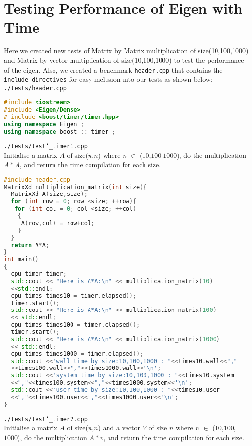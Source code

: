 \documentclass[11pt]{article}
\begin{document}
\section{Testing Performance of Eigen with Time}
Here we created new tests of Matrix by Matrix multiplication of size(10,100,1000) and Matrix by vector multiplication of size(10,100,1000) to test the performance of the eigen. Also, we created a benchmark \texttt{header.cpp} that contains the \texttt{include directives} for easy inclusion into our tests as shown below;\\
\vspace{5mm}
\texttt{./tests/header.cpp} 
\begin{lstlisting}[language=c++]
#include <iostream>
#include <Eigen/Dense>
# include <boost/timer/timer.hpp>
using namespace Eigen ;
using namespace boost :: timer ;
\end{lstlisting}
\vspace{5mm}
\texttt{./tests/test\char`_timer1.cpp}\\
Initialise a matrix $A$ of size($n$,$n$) where $n$ $\in$ ($10$,$100$,$1000$), do the multiplication $A*A$, and return the time compilation for each size.
\begin{lstlisting}[language=c++]
#include header.cpp
MatrixXd multiplication_matrix(int size){
  MatrixXd A(size,size);
  for (int row = 0; row <size; ++row){
   for (int col = 0; col <size; ++col)
    {
     A(row,col) = row+col;
    }
  }
  return A*A;
}
int main()
{
  cpu_timer timer;
  std::cout << "Here is A*A:\n" << multiplication_matrix(10)
  <<std::endl;
  cpu_times times10 = timer.elapsed();
  timer.start();
  std::cout << "Here is A*A:\n" << multiplication_matrix(100)
  << std::endl;
  cpu_times times100 = timer.elapsed();
  timer.start();  
  std::cout << "Here is A*A:\n" << multiplication_matrix(1000) 
  << std::endl;
  cpu_times times1000 = timer.elapsed();
  std::cout <<"wall time by size:10,100,1000 : "<<times10.wall<<","
  <<times100.wall<<","<<times1000.wall<<'\n';
  std::cout <<"system time by size:10,100,1000 : "<<times10.system
  <<","<<times100.system<<","<<times1000.system<<'\n';
  std::cout <<"user time by size:10,100,1000 : "<<times10.user
  <<","<<times100.user<<","<<times1000.user<<'\n'; 
}
\end{lstlisting}
\vspace{5mm}
\texttt{./tests/test\char`_timer2.cpp} \\
Initialise a matrix $A$ of size($n$,$n$) and a vector $V$ of size $n$ where $n$ $\in$ ($10$,$100$,$1000$), do the multiplication $A*v$, and return the time compilation for each size.
\end{document}
